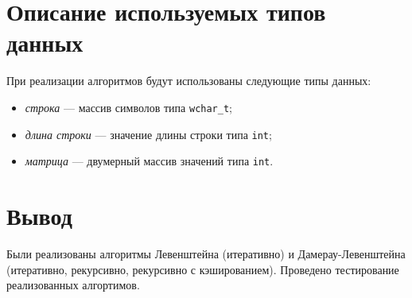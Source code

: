 \section{Описание используемых типов данных}

При реализации алгоритмов будут использованы следующие типы данных:

\begin{itemize}
    \item \textit{строка} --- массив символов типа \texttt{wchar\_t};
    \item \textit{длина строки} --- значение длины строки типа \texttt{int};
    \item \textit{матрица} --- двумерный массив значений типа \texttt{int}.
\end{itemize}

\section*{Вывод}

Были реализованы алгоритмы Левенштейна (итеративно) и Дамерау-Левенштейна (итеративно, рекурсивно, рекурсивно с кэшированием). Проведено тестирование реализованных алгортимов.